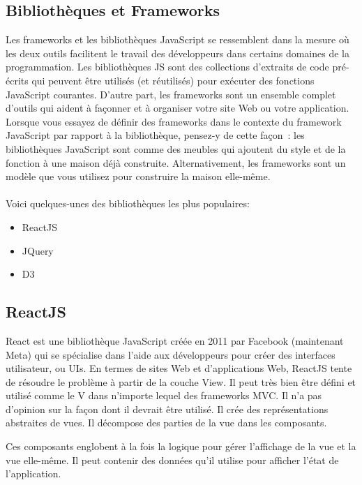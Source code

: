 \documentclass[12pt]{report}
\begin{document}
\subsection{Bibliothèques et Frameworks}
\vspace{0.1in}
Les frameworks et les bibliothèques JavaScript se ressemblent dans la mesure où les deux outils facilitent le travail des développeurs dans certains domaines de la programmation. Les bibliothèques JS sont des collections d’extraits de code pré-écrits qui peuvent être utilisés (et réutilisés) pour exécuter des fonctions JavaScript courantes. D’autre part, les frameworks sont un ensemble complet d’outils qui aident à façonner et à organiser votre site Web ou votre application. Lorsque vous essayez de définir des frameworks dans le contexte du framework JavaScript par rapport à la bibliothèque, pensez-y de cette façon : les bibliothèques JavaScript sont comme des meubles qui ajoutent du style et de la fonction à une maison déjà construite. Alternativement, les frameworks sont un modèle que vous utilisez pour construire la maison elle-même.
\\\\
Voici quelques-unes des bibliothèques les plus populaires:
\begin{itemize}
    \item ReactJS
    \item JQuery
    \item D3
\end{itemize}

\subsection{ReactJS}
\vspace{0.1in}
React est une bibliothèque JavaScript créée en 2011 par Facebook (maintenant Meta) qui se spécialise dans l’aide aux développeurs pour créer des interfaces utilisateur, ou UIs. En termes de sites Web et d’applications Web, ReactJS tente de résoudre le problème à partir de la couche View. Il peut très bien être défini et utilisé comme le V dans n’importe lequel des frameworks MVC. Il n’a pas d’opinion sur la façon dont il devrait être utilisé. Il crée des représentations abstraites de vues. Il décompose des parties de la vue dans les composants.

\newpage

Ces composants englobent à la fois la logique pour gérer l’affichage de la vue et la vue elle-même. Il peut contenir des données qu’il utilise pour afficher l’état de l’application.
\end{document}
